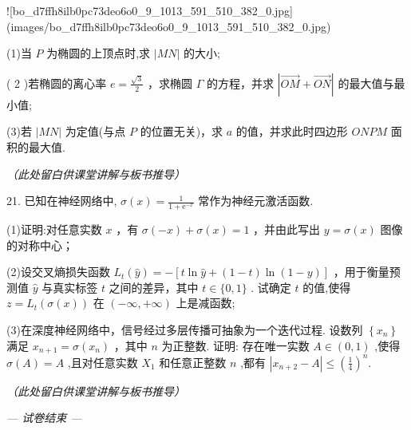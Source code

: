\documentclass[10pt]{article}
\newcommand{\largeboardspace}{%
  \par\vspace{8cm}
  \hfill\textit{（此处留白供课堂讲解与板书推导）}
  \par\vspace{1cm}
}
\begin{document}
![bo_d7ffh8ilb0pc73deo6o0_9_1013_591_510_382_0.jpg](images/bo_d7ffh8ilb0pc73deo6o0_9_1013_591_510_382_0.jpg)

(1)当 \(P\) 为椭圆的上顶点时,求 \(\left| {MN}\right|\) 的大小;

( 2 )若椭圆的离心率 \(e = \frac{\sqrt{3}}{2}\) ，求椭圆 \(\Gamma\) 的方程，并求 \(\left| {\overrightarrow{OM} + \overrightarrow{ON}}\right|\) 的最大值与最小值;

(3)若 \(\left| {MN}\right|\) 为定值(与点 \(P\) 的位置无关)，求 \(a\) 的值，并求此时四边形 \({ONPM}\) 面积的最大值.

\largeboardspace

\newpage

21. 已知在神经网络中, \(\sigma \left( x\right)  = \frac{1}{1 + {\mathrm{e}}^{-x}}\) 常作为神经元激活函数.

(1)证明:对任意实数 \(x\) ，有 \(\sigma \left( {-x}\right)  + \sigma \left( x\right)  = 1\) ，并由此写出 \(y = \sigma \left( x\right)\) 图像的对称中心；

(2)设交叉熵损失函数 \({L}_{t}\left( \widehat{y}\right)  =  - \left\lbrack  {t\ln \widehat{y} + \left( {1 - t}\right) \ln \left( {1 - y}\right) }\right\rbrack\) ，用于衡量预测值 \(\widehat{y}\) 与真实标签 \(t\) 之间的差异，其中 \(t \in  \{ 0,1\}\) . 试确定 \(t\) 的值,使得 \(z = {L}_{t}\left( {\sigma \left( x\right) }\right)\) 在 \(\left( {-\infty , + \infty }\right)\) 上是减函数;

(3)在深度神经网络中，信号经过多层传播可抽象为一个迭代过程. 设数列 \(\left\{  {x}_{n}\right\}\) 满足 \({x}_{n + 1} = \sigma \left( {x}_{n}\right)\) ，其中 \(n\) 为正整数. 证明: 存在唯一实数 \(A \in  \left( {0,1}\right)\) ,使得 \(\sigma \left( A\right)  = A\) ,且对任意实数 \({X}_{1}\) 和任意正整数 \(n\) ,都有 \(\left| {{x}_{n + 2} - A}\right|  \leq  {\left( \frac{1}{4}\right) }^{n}.\)

\largeboardspace

\vfill
\begin{center}
\textit{— 试卷结束 —}
\end{center}
\end{document}
